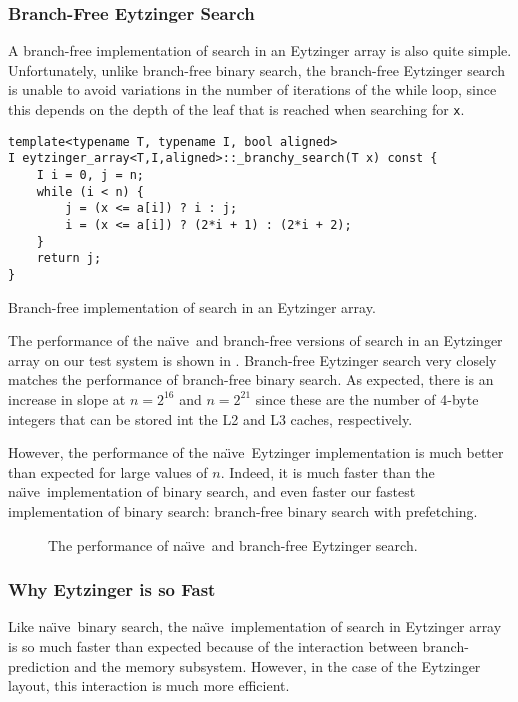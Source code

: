\documentclass{patmorin}
\newcommand{\naive}{na\"{\i}ve}
\begin{document}
\subsubsection{Branch-Free Eytzinger Search}

A branch-free implementation of search in an Eytzinger array is also
quite simple. Unfortunately, unlike branch-free binary search, the
branch-free Eytzinger search is unable to avoid variations in the number
of iterations of the while loop, since this depends on the depth of the
leaf that is reached when searching for \texttt{x}.

\begin{listing}
\begin{verbatim}
template<typename T, typename I, bool aligned>
I eytzinger_array<T,I,aligned>::_branchy_search(T x) const {
    I i = 0, j = n;
    while (i < n) {
        j = (x <= a[i]) ? i : j;
        i = (x <= a[i]) ? (2*i + 1) : (2*i + 2);
    }
    return j;
}
\end{verbatim}
\caption{Branch-free implementation of search in an Eytzinger array.}
\end{listing}

The performance of the \naive\ and branch-free versions of search in
an Eytzinger array on our test system is shown in .
Branch-free Eytzinger search very closely matches the performance of
branch-free binary search. As expected, there is an increase in slope at
$n=2^{16}$ and $n=2^{21}$ since these are the number of 4-byte integers
that can be stored int the L2 and L3 caches, respectively.

However, the performance of the \naive\ Eytzinger implementation is
much better than expected for large values of $n$. Indeed, it is much
faster than the \naive\ implementation of binary search, and even
faster our fastest implementation of binary search: branch-free binary
search with prefetching.

\begin{figure}
   \caption{The performance of \naive\ and branch-free Eytzinger search.}
\end{figure}

\subsubsection{Why Eytzinger is so Fast}

Like \naive\ binary search, the \naive\ implementation of search in
Eytzinger array is so much faster than expected because of the interaction
between branch-prediction and the memory subsystem.  However, in the
case of the Eytzinger layout, this interaction is much more efficient.
\end{document}
